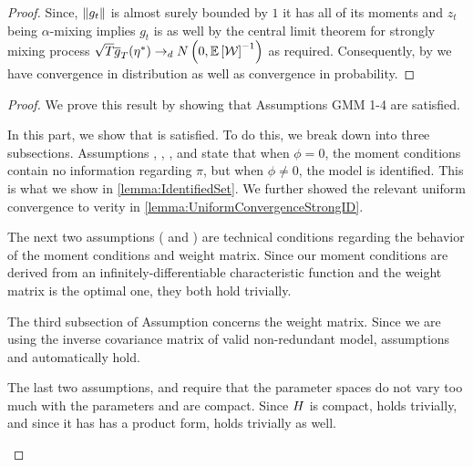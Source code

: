 \documentclass[11pt, letterpaper, twoside, final]{article}
\begin{document}
\begin{appendices}
\begin{proof}

    Since, $\norm*{g_t}$ is almost surely bounded by $1$ it has all of its moments and $z_t$ being $\alpha$-mixing
    implies $g_t$ is as well by the central limit theorem for strongly mixing process $\sqrt{T} \sampmom(\eta^{*})
    \dto \N\left(0, \E\left[\W\right]^{-1}\right)$ as required. 
    Consequently, by \textcite[theorem 3.2]{newey1994large} we have convergence in distribution as well as
    convergence in probability.
    

\end{proof}


\InferenceWeakID*

\begin{proof}
We prove this result by showing that Assumptions GMM 1-4 are satisfied.

\begin{proofpart}
    \label{part:main_theorem_proof_part1}
    In this part, we show that  is satisfied. 
    To do this, we break   down into three subsections.
    Assumptions , , , and  state
    that when $\phi = 0$, the moment conditions contain no information regarding $\pi$, but when $\phi \neq 0$,
    the model is identified.
    This is what we show in \cref{lemma:IdentifiedSet}.
    We further showed the relevant uniform convergence to verity  in
    \cref{lemma:UniformConvergenceStrongID}.
    
    The next two assumptions ( and ) are  technical conditions regarding
    the behavior of the moment conditions and weight matrix. 
    Since our moment conditions are derived from an infinitely-differentiable  characteristic function and the
    weight matrix is the optimal one, they both hold trivially.
    
    The third subsection of Assumption  concerns the weight matrix.
    Since we are using the inverse covariance matrix of valid non-redundant model, assumptions
     and  automatically hold.
    
    The last two assumptions,  and  require that the parameter spaces do
    not vary too much with the parameters and are compact.
    Since $\Eta$ is compact,  holds trivially, and since it has  has a product form,
      holds trivially as well.
    

\end{proofpart}
\end{proof}
\end{appendices}
\end{document}
